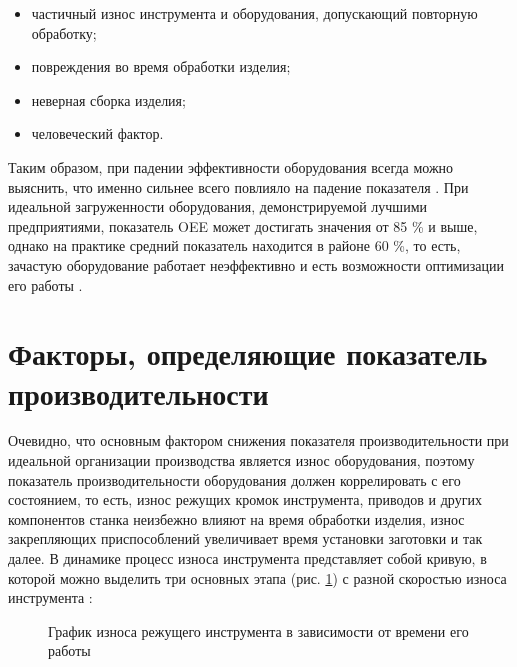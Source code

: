 \begin{itemize}
	\item частичный износ инструмента и оборудования, допускающий повторную обработку;
	\item повреждения во время обработки изделия;
	\item неверная сборка изделия;
	\item человеческий фактор.
\end{itemize}

Таким образом, при падении эффективности оборудования всегда можно выяснить, что именно сильнее всего повлияло на падение показателя \cite{Sidorchik}. При идеальной загруженности оборудования, демонстрируемой лучшими предприятиями, показатель OEE может достигать значения от 85 \% и выше, однако на практике средний показатель находится в районе 60 \%, то есть, зачастую оборудование работает неэффективно и есть возможности оптимизации его работы \cite{web:oee}.

\section{Факторы, определяющие показатель производительности} \label{sect2_2}

Очевидно, что основным фактором снижения показателя производительности при идеальной организации производства является износ оборудования, поэтому показатель производительности оборудования должен коррелировать с его состоянием, то есть, износ режущих кромок инструмента, приводов и других компонентов станка неизбежно влияют на время обработки изделия, износ закрепляющих приспособлений увеличивает время установки заготовки и так далее. В динамике процесс износа инструмента представляет собой кривую, в которой можно выделить три основных этапа (рис. \cref{fig:iznos}) с разной скоростью износа инструмента \cite{Bezjazychniy}:

\begin{figure}[ht]
	\caption{График износа режущего инструмента в зависимости от времени его работы}\label{fig:iznos}
\end{figure}

